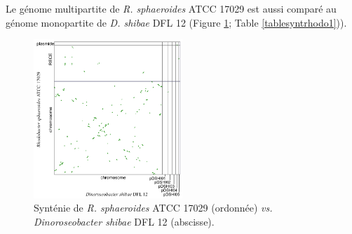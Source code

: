    
Le génome multipartite de \textit{R. sphaeroides} ATCC 17029 est aussi comparé au génome monopartite de \textit{D. shibae} DFL 12 (Figure \ref{figsyntpararhodo}; Table \ref{tablesyntrhodo1})).

\begin{figure}[H]
		\begin{center}
			\includegraphics[width=0.5\textwidth]{./img/synteny/new/fig8_3.png}
			\caption[Synténie de \textit{Rhodobacter} \textit{vs.} \textit{D. shibae} ]{Synténie de \textit{R. sphaeroides}  ATCC 17029 (ordonnée) \textit{vs.} \textit{Dinoroseobacter shibae} DFL 12 (abscisse).}\label{figsyntpararhodo}
			\end{center}
\end{figure}


